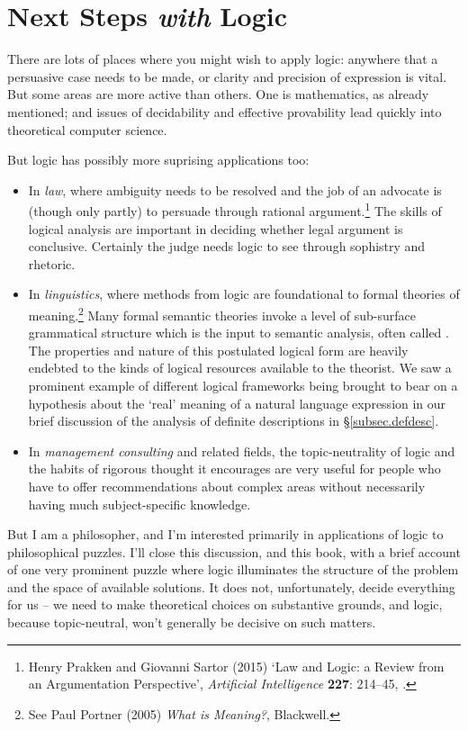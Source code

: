 \section{Next Steps \emph{with} Logic}\label{stepwith}

There are lots of places where you might wish to apply logic: anywhere that a persuasive case needs to be made, or clarity and precision of expression is vital. But some areas are more active than others. One is mathematics, as already mentioned; and issues of decidability and effective provability lead quickly into theoretical computer science. 

But logic has possibly more suprising applications too: \begin{itemize}
	\item  In \emph{law}, where ambiguity needs to be resolved and the job of an advocate is (though only partly) to persuade through rational argument.\footnote{Henry Prakken and Giovanni Sartor (2015) ‘Law and Logic: a Review from an Argumentation Perspective’, \emph{Artificial Intelligence} \textbf{227}: 214–45, .} The skills of logical analysis are important in deciding whether legal argument is conclusive. Certainly the judge needs logic to see through sophistry and rhetoric. 
\item  In \emph{linguistics}, where methods from logic are foundational to formal theories of meaning.\footnote{See Paul Portner (2005) \emph{What is Meaning?}, Blackwell.} Many formal semantic theories invoke a level of sub-surface grammatical structure which is the input to semantic analysis, often called . The properties and nature of this postulated logical form are heavily endebted to the kinds of logical resources available to the theorist. We saw a prominent example of different logical frameworks being brought to bear on a hypothesis about the `real' meaning of a natural language expression in our brief discussion of the analysis of definite descriptions in §\ref{subsec.defdesc}. 
\item  In \emph{management consulting} and related fields, the topic‐neutrality of logic and the habits of rigorous thought it encourages are very useful for people who have to offer recommendations about complex areas without necessarily having much subject-specific knowledge.
\end{itemize}

But I am a philosopher, and I'm interested primarily in applications of logic to philosophical puzzles. I'll close this discussion, and this book, with a brief account of one very prominent puzzle where logic illuminates the structure of the problem and the space of available solutions. It does not, unfortunately, decide everything for us – we need to make theoretical choices on substantive grounds, and logic, because topic-neutral, won't generally be decisive on such matters. 

